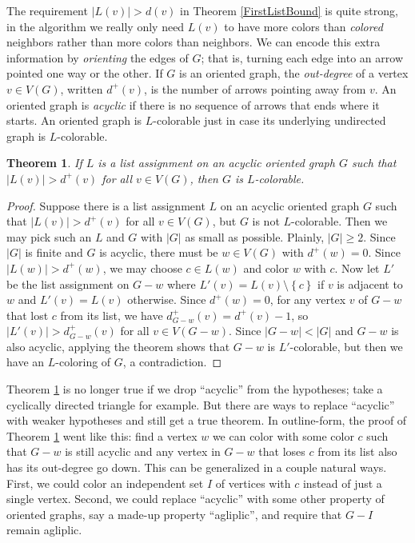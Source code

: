 \documentclass[openany]{tufte-book} %
\theoremstyle{plain}
\newtheorem{theorem}{Theorem}
\newcommand{\set}[1]{\left\{ #1 \right\}}
\newcommand{\card}[1]{\left|#1\right|}
\begin{document}
The requirement $\card{L(v)} > d(v)$ in Theorem \ref{FirstListBound} is quite strong, in the algorithm we really only need $L(v)$ to have more colors 
than \emph{colored} neighbors rather than more colors than neighbors.  We can encode this extra information by \emph{orienting} the edges of $G$; that is, turning
each edge into an arrow pointed one way or the other.  If $G$ is an oriented graph, the \emph{out-degree} of a vertex $v \in V(G)$, written $d^+(v)$, is the number of arrows
pointing away from $v$.  An oriented graph is \emph{acyclic} if there is no sequence of arrows that ends where it starts.  An oriented graph is $L$-colorable just in case its
underlying undirected graph is $L$-colorable.

\begin{theorem}\label{SecondListBound}
If $L$ is a list assignment on an acyclic oriented graph $G$ such that $\card{L(v)} > d^+(v)$ for all $v \in V(G)$, then $G$ is $L$-colorable.
\end{theorem}
\begin{proof}
Suppose there is a list assignment $L$ on an acyclic oriented graph $G$ such that $\card{L(v)} > d^+(v)$ for all $v \in V(G)$, but $G$ is not $L$-colorable.  Then
we may pick such an $L$ and $G$ with $\card{G}$ as small as possible.  Plainly, $\card{G} \ge 2$. Since $\card{G}$ is finite and $G$ is acyclic, there must be $w \in V(G)$ with $d^+(w) = 0$.
Since $\card{L(w)} > d^+(w)$, we may choose $c \in L(w)$ and color $w$ with $c$.  Now let $L'$ be the list assignment on $G-w$ where $L'(v) = L(v) \setminus \set{c}$ if $v$
is adjacent to $w$ and $L'(v) = L(v)$ otherwise.  Since $d^+(w) = 0$, for any vertex $v$ of $G-w$ that lost $c$ from its list, we have $d_{G-w}^+(v) = d^+(v) - 1$, so 
$\card{L'(v)} > d_{G-w}^+(v)$ for all $v \in V(G-w)$.  Since $\card{G-w} < \card{G}$ and $G-w$ is also acyclic, applying the theorem shows that $G-w$ is $L'$-colorable, but then we have an $L$-coloring
of $G$, a contradiction.
\end{proof}

Theorem \ref{SecondListBound} is no longer true if we drop ``acyclic'' from the hypotheses; take a cyclically directed triangle for example.  
But there are ways to replace ``acyclic'' with weaker hypotheses and still get a true theorem.  In outline-form, the proof of Theorem \ref{SecondListBound} went like this: 
find a vertex $w$ we can color with some color $c$ such that $G-w$ is still acyclic and any vertex in $G-w$ that loses $c$ from its list also has its out-degree go down. 
This can be generalized in a couple natural ways.  First, we could color an independent set $I$ of vertices with $c$ instead of just a single vertex.  Second, we could replace ``acyclic'' with
some other property of oriented graphs, say a made-up property ``agliplic'', and require that $G-I$ remain agliplic.
\end{document}
